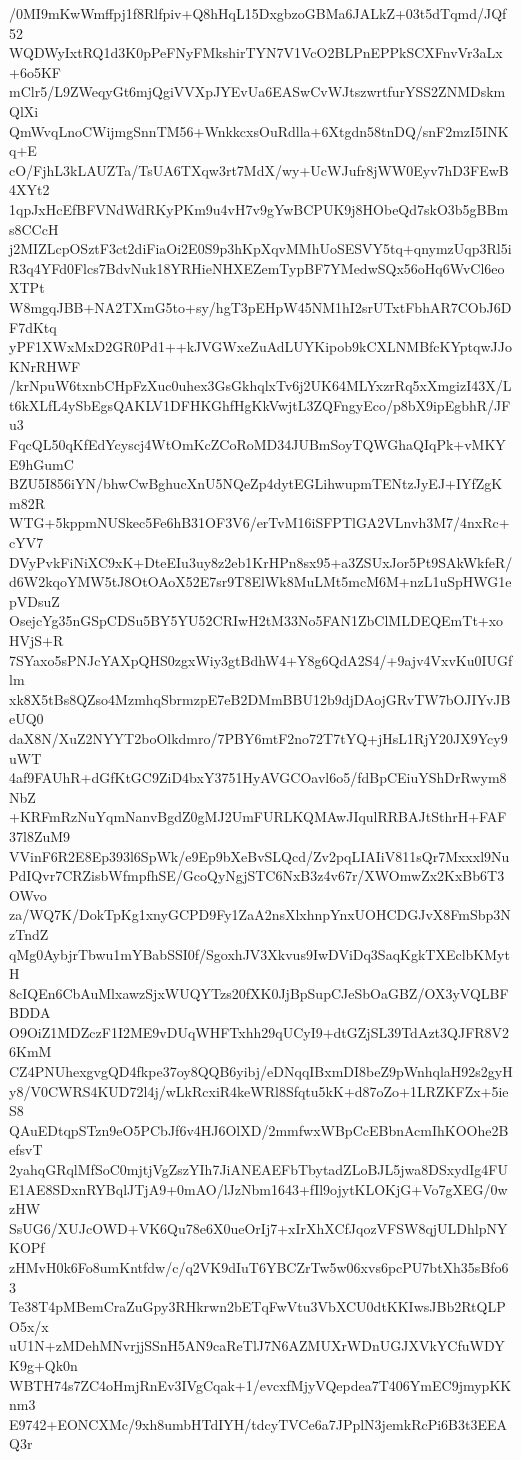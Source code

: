 /0MI9mKwWmffpj1f8Rlfpiv+Q8hHqL15DxgbzoGBMa6JALkZ+03t5dTqmd/JQf52
WQDWyIxtRQ1d3K0pPeFNyFMkshirTYN7V1VcO2BLPnEPPkSCXFnvVr3aLx+6o5KF
mClr5/L9ZWeqyGt6mjQgiVVXpJYEvUa6EASwCvWJtszwrtfurYSS2ZNMDskmQlXi
QmWvqLnoCWijmgSnnTM56+WnkkcxsOuRdlla+6Xtgdn58tnDQ/snF2mzI5INKq+E
cO/FjhL3kLAUZTa/TsUA6TXqw3rt7MdX/wy+UcWJufr8jWW0Eyv7hD3FEwB4XYt2
1qpJxHcEfBFVNdWdRKyPKm9u4vH7v9gYwBCPUK9j8HObeQd7skO3b5gBBms8CCcH
j2MIZLcpOSztF3ct2diFiaOi2E0S9p3hKpXqvMMhUoSESVY5tq+qnymzUqp3Rl5i
R3q4YFd0Flcs7BdvNuk18YRHieNHXEZemTypBF7YMedwSQx56oHq6WvCl6eoXTPt
W8mgqJBB+NA2TXmG5to+sy/hgT3pEHpW45NM1hI2srUTxtFbhAR7CObJ6DF7dKtq
yPF1XWxMxD2GR0Pd1++kJVGWxeZuAdLUYKipob9kCXLNMBfcKYptqwJJoKNrRHWF
/krNpuW6txnbCHpFzXuc0uhex3GsGkhqlxTv6j2UK64MLYxzrRq5xXmgizI43X/L
t6kXLfL4ySbEgsQAKLV1DFHKGhfHgKkVwjtL3ZQFngyEco/p8bX9ipEgbhR/JFu3
FqcQL50qKfEdYcyscj4WtOmKcZCoRoMD34JUBmSoyTQWGhaQIqPk+vMKYE9hGumC
BZU5I856iYN/bhwCwBghucXnU5NQeZp4dytEGLihwupmTENtzJyEJ+IYfZgKm82R
WTG+5kppmNUSkec5Fe6hB31OF3V6/erTvM16iSFPTlGA2VLnvh3M7/4nxRc+cYV7
DVyPvkFiNiXC9xK+DteEIu3uy8z2eb1KrHPn8sx95+a3ZSUxJor5Pt9SAkWkfeR/
d6W2kqoYMW5tJ8OtOAoX52E7sr9T8ElWk8MuLMt5mcM6M+nzL1uSpHWG1epVDsuZ
OsejcYg35nGSpCDSu5BY5YU52CRIwH2tM33No5FAN1ZbClMLDEQEmTt+xoHVjS+R
7SYaxo5sPNJcYAXpQHS0zgxWiy3gtBdhW4+Y8g6QdA2S4/+9ajv4VxvKu0IUGflm
xk8X5tBs8QZso4MzmhqSbrmzpE7eB2DMmBBU12b9djDAojGRvTW7bOJIYvJBeUQ0
daX8N/XuZ2NYYT2boOlkdmro/7PBY6mtF2no72T7tYQ+jHsL1RjY20JX9Ycy9uWT
4af9FAUhR+dGfKtGC9ZiD4bxY3751HyAVGCOavl6o5/fdBpCEiuYShDrRwym8NbZ
+KRFmRzNuYqmNanvBgdZ0gMJ2UmFURLKQMAwJIqulRRBAJtSthrH+FAF37l8ZuM9
VVinF6R2E8Ep393l6SpWk/e9Ep9bXeBvSLQcd/Zv2pqLIAIiV811sQr7Mxxxl9Nu
PdIQvr7CRZisbWfmpfhSE/GcoQyNgjSTC6NxB3z4v67r/XWOmwZx2KxBb6T3OWvo
za/WQ7K/DokTpKg1xnyGCPD9Fy1ZaA2nsXlxhnpYnxUOHCDGJvX8FmSbp3NzTndZ
qMg0AybjrTbwu1mYBabSSI0f/SgoxhJV3Xkvus9IwDViDq3SaqKgkTXEclbKMytH
8cIQEn6CbAuMlxawzSjxWUQYTzs20fXK0JjBpSupCJeSbOaGBZ/OX3yVQLBFBDDA
O9OiZ1MDZczF1I2ME9vDUqWHFTxhh29qUCyI9+dtGZjSL39TdAzt3QJFR8V26KmM
CZ4PNUhexgvgQD4fkpe37oy8QQB6yibj/eDNqqIBxmDI8beZ9pWnhqlaH92s2gyH
y8/V0CWRS4KUD72l4j/wLkRcxiR4keWRl8Sfqtu5kK+d87oZo+1LRZKFZx+5ieS8
QAuEDtqpSTzn9eO5PCbJf6v4HJ6OlXD/2mmfwxWBpCcEBbnAcmIhKOOhe2BefsvT
2yahqGRqlMfSoC0mjtjVgZszYIh7JiANEAEFbTbytadZLoBJL5jwa8DSxydIg4FU
E1AE8SDxnRYBqlJTjA9+0mAO/lJzNbm1643+fIl9ojytKLOKjG+Vo7gXEG/0wzHW
SsUG6/XUJcOWD+VK6Qu78e6X0ueOrIj7+xIrXhXCfJqozVFSW8qjULDhlpNYKOPf
zHMvH0k6Fo8umKntfdw/c/q2VK9dIuT6YBCZrTw5w06xvs6pcPU7btXh35sBfo63
Te38T4pMBemCraZuGpy3RHkrwn2bETqFwVtu3VbXCU0dtKKIwsJBb2RtQLPO5x/x
uU1N+zMDehMNvrjjSSnH5AN9caReTlJ7N6AZMUXrWDnUGJXVkYCfuWDYK9g+Qk0n
WBTH74s7ZC4oHmjRnEv3IVgCqak+1/evcxfMjyVQepdea7T406YmEC9jmypKKnm3
E9742+EONCXMc/9xh8umbHTdIYH/tdcyTVCe6a7JPplN3jemkRcPi6B3t3EEAQ3r

